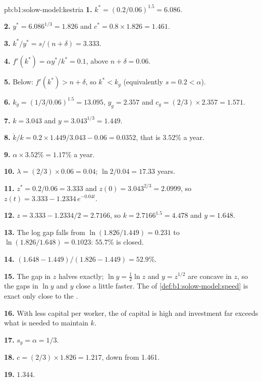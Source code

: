 \begin{solution}{pb:b1:solow-model:kestria}
\textbf{1.} $k^* = (0.2/0.06)^{1.5} = 6.086$.

\textbf{2.} $y^* = 6.086^{1/3} = 1.826$ and $c^* = 0.8 \times 1.826 = 1.461$.

\textbf{3.} $k^*/y^* = s/(n + \delta) = 3.333$.

\textbf{4.} $f'(k^*) = \alpha y^*/k^* = 0.1$, above $n + \delta = 0.06$.

\textbf{5.} Below: $f'(k^*) > n + \delta$, so $k^* < k_g$ (equivalently $s = 0.2 < \alpha$).

\textbf{6.} $k_g = (1/3 / 0.06)^{1.5} = 13.095$, $y_g = 2.357$ and $c_g = (2/3) \times 2.357 = 1.571$.

\textbf{7.} $k = 3.043$ and $y = 3.043^{1/3} = 1.449$.

\textbf{8.} $\dot k/k = 0.2 \times 1.449/3.043 - 0.06 = 0.0352$, that is $3.52\%$ a year.

\textbf{9.} $\alpha \times 3.52\% = 1.17\%$ a year.

\textbf{10.} $\lambda = (2/3) \times 0.06 = 0.04$;  $\ln 2/0.04 = 17.33$ years.

\textbf{11.} $z^* = 0.2/0.06 = 3.333$ and $z(0) = 3.043^{2/3} = 2.0999$, so
$z(t) = 3.333 - 1.2334\,e^{-0.04t}$.

\textbf{12.} $z = 3.333 - 1.2334/2 = 2.7166$, so $k = 2.7166^{1.5} = 4.478$ and $y = 1.648$.

\textbf{13.} The log gap falls from $\ln(1.826/1.449) = 0.231$ to $\ln(1.826/1.648) = 0.1023$:
$55.7\%$ is closed.

\textbf{14.} $(1.648 - 1.449)/(1.826 - 1.449) = 52.9\%$.

\textbf{15.} The gap in $z$ halves exactly; $\ln y = \tfrac12 \ln z$ and $y = z^{1/2}$ are concave
in $z$, so the gaps in $\ln y$ and $y$ close a little faster. The  of
\cref{def:b1:solow-model:speed} is exact only close to the .

\textbf{16.} With less capital per worker, the  of capital
is high and investment far exceeds what is needed to maintain $k$.

\textbf{17.} $s_g = \alpha = 1/3$.

\textbf{18.} $c = (2/3) \times 1.826 = 1.217$, down from 1.461.

\textbf{19.} $1.344$.


\end{solution}
